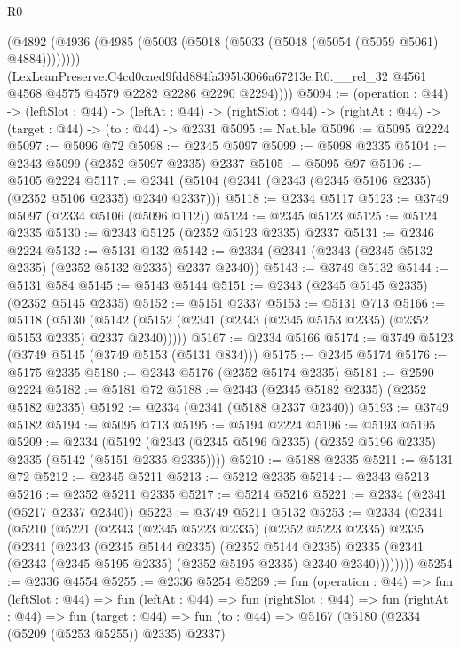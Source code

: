 \begin{lexlean}{R0}
\begin{coremodule}
          (@4892 (@4936 (@4985 (@5003 (@5018 (@5033 (@5048 (@5054 (@5059 @5061) @4884))))))))
          (LexLeanPreserve.C4cd0caed9fdd884fa395b3066a67213e.R0.__rel_32
            @4561
            @4568
            @4575
            @4579
            @2282
            @2286
            @2290
            @2294))))
@5094 := (operation : @44) ->
  (leftSlot : @44) ->
  (leftAt : @44) -> (rightSlot : @44) -> (rightAt : @44) -> (target : @44) -> (to : @44) -> @2331
@5095 := Nat.ble
@5096 := @5095 @2224
@5097 := @5096 @72
@5098 := @2345 @5097
@5099 := @5098 @2335
@5104 := @2343 @5099 (@2352 @5097 @2335) @2337
@5105 := @5095 @97
@5106 := @5105 @2224
@5117 := @2341 (@5104 (@2341 (@2343 (@2345 @5106 @2335) (@2352 @5106 @2335) @2340 @2337)))
@5118 := @2334 @5117
@5123 := @3749 @5097 (@2334 @5106 (@5096 @112))
@5124 := @2345 @5123
@5125 := @5124 @2335
@5130 := @2343 @5125 (@2352 @5123 @2335) @2337
@5131 := @2346 @2224
@5132 := @5131 @132
@5142 := @2334 (@2341 (@2343 (@2345 @5132 @2335) (@2352 @5132 @2335) @2337 @2340))
@5143 := @3749 @5132
@5144 := @5131 @584
@5145 := @5143 @5144
@5151 := @2343 (@2345 @5145 @2335) (@2352 @5145 @2335)
@5152 := @5151 @2337
@5153 := @5131 @713
@5166 := @5118
    (@5130 (@5142 (@5152 (@2341 (@2343 (@2345 @5153 @2335) (@2352 @5153 @2335) @2337 @2340)))))
@5167 := @2334 @5166
@5174 := @3749 @5123 (@3749 @5145 (@3749 @5153 (@5131 @834)))
@5175 := @2345 @5174
@5176 := @5175 @2335
@5180 := @2343 @5176 (@2352 @5174 @2335)
@5181 := @2590 @2224
@5182 := @5181 @72
@5188 := @2343 (@2345 @5182 @2335) (@2352 @5182 @2335)
@5192 := @2334 (@2341 (@5188 @2337 @2340))
@5193 := @3749 @5182
@5194 := @5095 @713
@5195 := @5194 @2224
@5196 := @5193 @5195
@5209 := @2334
    (@5192 (@2343 (@2345 @5196 @2335) (@2352 @5196 @2335) @2335 (@5142 (@5151 @2335 @2335))))
@5210 := @5188 @2335
@5211 := @5131 @72
@5212 := @2345 @5211
@5213 := @5212 @2335
@5214 := @2343 @5213
@5216 := @2352 @5211 @2335
@5217 := @5214 @5216
@5221 := @2334 (@2341 (@5217 @2337 @2340))
@5223 := @3749 @5211 @5132
@5253 := @2334
    (@2341
      (@5210
        (@5221
          (@2343
            (@2345 @5223 @2335)
            (@2352 @5223 @2335)
            @2335
            (@2341
              (@2343
                (@2345 @5144 @2335)
                (@2352 @5144 @2335)
                @2335
                (@2341 (@2343 (@2345 @5195 @2335) (@2352 @5195 @2335) @2340 @2340))))))))
@5254 := @2336 @4554
@5255 := @2336 @5254
@5269 := fun (operation : @44) =>
  fun (leftSlot : @44) =>
  fun (leftAt : @44) =>
  fun (rightSlot : @44) =>
  fun (rightAt : @44) =>
  fun (target : @44) => fun (to : @44) => @5167 (@5180 (@2334 (@5209 (@5253 @5255)) @2335) @2337)

\end{coremodule}
\end{lexlean}
